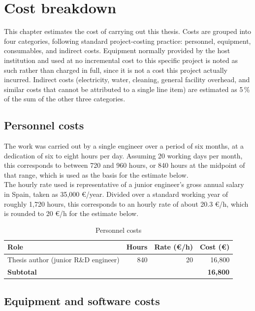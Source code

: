 \chapter{Cost breakdown}\label{ch:cost}

This chapter estimates the cost of carrying out this thesis. Costs are grouped into four
categories, following standard project-costing practice: personnel, equipment, consumables,
and indirect costs. Equipment normally provided by the host institution and used at no
incremental cost to this specific project is noted as such rather than charged in full, since
it is not a cost this project actually incurred. Indirect costs (electricity, water,
cleaning, general facility overhead, and similar costs that cannot be attributed to a single
line item) are estimated as 5\,\% of the sum of the other three categories.

\section{Personnel costs}

The work was carried out by a single engineer over a period of six
months, at a dedication of six to eight hours per day. Assuming 20 working days per month, this
corresponds to between 720 and 960 hours, or 840 hours at the midpoint of that range, which is
used as the basis for the estimate below. \\

The hourly rate used is representative of a junior engineer's gross annual salary in Spain,
taken as  35{,}000 \euro/year. Divided over a standard working year of roughly 1{,}720 hours,
this corresponds to an hourly rate of about  20.3 \euro/h, which is rounded to  20 \euro/h for the
estimate below.

\begin{table}[h]
  \centering
  \begin{tabular}{lrrr}
    \hline
    Role & Hours & Rate (\euro/h) & Cost (\euro) \\
    \hline
    Thesis author (junior R\&D engineer) & 840 & 20 & 16{,}800 \\
    \hline
    \textbf{Subtotal} & & & \textbf{16{,}800} \\
    \hline
  \end{tabular}
  \caption{Personnel costs}
  \label{tab:budget-personnel}
\end{table}

\section{Equipment and software costs}

